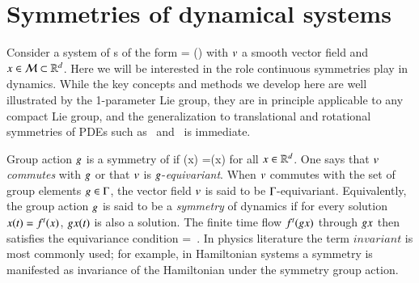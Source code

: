 
\section{\label{s:symDyn} Symmetries of dynamical systems}

Consider a system of \ode s of the form
\beq
	\dot{\ssp} = \vf(\ssp)
	\label{eq:difeq}
\eeq
with $v$ a smooth vector field and $x\in{\cal M}\subset\mathbb{R}^{d}$.
Here we will be interested in the role continuous symmetries
play in dynamics.
While the key concepts and methods we develop here are well
illustrated by the 1-parameter Lie  group, they are in
principle applicable to any compact Lie group, and the
generalization to translational and rotational symmetries of
PDEs such as \KS\ and \pCf\ is immediate.

Group action $g$ is a symmetry of
 if
\beq
	\vf(\LieEl x) =\LieEl \vf(x)
	\label{eq:equiv}
\eeq
for all $x\in\mathbb{R}^{d}$. One  says that $v$ \emph{commutes}
with $g$ or that $v$ is $g$-\emph{equivariant}.
When $v$ commutes with the set of group elements
$g\in\Gamma$, the vector field $v$ is said to be $\Gamma$-equivariant.
Equivalently, the group action $g$ is said to be a {\em
symmetry} of dynamics if for every solution $x(t)=
{f^{t}(x)}$, $g x(t)$ is also a solution. The finite
time flow ${f^{t}(g x)}$ through $g x$ then
satisfies the equivariance condition
\beq\label{eq:equivFinite}
=\LieEl{}
\,.
\eeq
In physics literature the term $invariant$ is most commonly
used; for example, in Hamiltonian systems a symmetry is
manifested as invariance of the Hamiltonian under the
symmetry group action.

